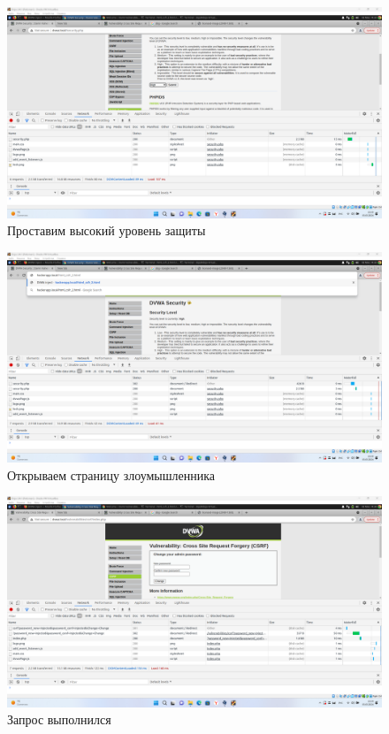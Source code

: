 \documentclass[a4paper]{article}
\begin{document}
  \begin{figure}[H]
    \centering
    \includegraphics[width=\textwidth]{Screenshot_107}
    \caption{Проставим высокий уровень защиты}
  \end{figure}

  \begin{figure}[H]
    \centering
    \includegraphics[width=\textwidth]{Screenshot_108}
    \caption{Открываем страницу злоумышленника}
  \end{figure}

  \begin{figure}[H]
    \centering
    \includegraphics[width=\textwidth]{Screenshot_109}
    \caption{Запрос выполнился}
  \end{figure}
\end{document}
